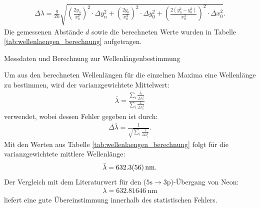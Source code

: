 \documentclass[11pt, a4paper]{article}
\numberwithin{equation}{section}
\begin{document}
\begin{align}
	\Delta \lambda = \frac{g}{2 n} \sqrt{\left( \frac{2 y_n}{x_0^2} \right)^2 \cdot \Delta y_n^2 + \left( \frac{2 y_0}{x_0^2} \right)^2 \cdot \Delta y_0^2 + \left(\frac{2\left(y_n^2 - y_0^2 \right)}{x_0^3}\right)^2 \cdot \Delta x_0^2} \text{.}
\end{align}
Die gemessenen Abstände $d$ sowie die berechneten Werte wurden in Tabelle \ref{tab:wellenlaengen_berechnung} aufgetragen.
\begin{table}[h]
	\centering
	
	\caption{Messdaten und Berechnung zur Wellenlängenbestimmung}
	\label{tab:wellenlaengen_berechnung}
\end{table}
Um aus den berechneten Wellenlängen für die einzelnen Maxima eine Wellenlänge zu bestimmen, wird der varianzgewichtete Mittelwert:
\begin{align}
	\bar{\lambda} = \frac{\sum_i \frac{\lambda_i}{\Delta \lambda_i^2}}{\sum_i \frac{1}{\Delta \lambda_i^2}}
\end{align}
verwendet, wobei dessen Fehler gegeben ist durch:
\begin{align}
\Delta \bar{\lambda} = \frac{1}{\sqrt{\sum_i \frac{1}{\Delta \lambda_i^2}}} \text{.}
\end{align}
Mit den Werten aus Tabelle \ref{tab:wellenlaengen_berechnung} folgt für die varianzgewichtete mittlere Wellenlänge:
\begin{align}
	\bar{\lambda} = \SI{632.3 +- 5.6}{\nano\metre} \text{.}
\end{align}
Der Vergleich mit dem Literaturwert \cite{NISTSpectra} für den ($\mathrm{5s} \rightarrow \mathrm{3p}$)-Übergang von Neon:
\begin{align}
	\lambda = \SI{632.81646}{\nano\metre}
\end{align}
liefert eine gute Übereinstimmung innerhalb des statistischen Fehlers.
\end{document}
